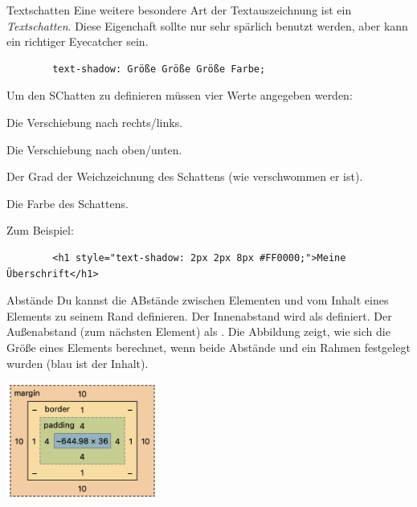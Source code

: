 \documentclass[lerntheke,12pt,a5paper,landscape]{arbeitsblatt}
\begin{document}
\begin{loesungskarte}{Textschatten}
	Eine weitere besondere Art der Textauszeichnung ist ein \emph{Textschatten}. Diese Eigenchaft sollte nur sehr spärlich benutzt werden, aber kann ein richtiger Eyecatcher sein.

	\begin{verbatim}
		text-shadow: Größe Größe Größe Farbe;
	\end{verbatim}

	Um den SChatten zu definieren müssen vier Werte angegeben werden:
	\begin{smallenum}
		\item Die Verschiebung nach rechts/links.
		\item Die Verschiebung nach oben/unten.
		\item Der Grad der Weichzeichnung des Schattens (wie verschwommen er ist).
		\item Die Farbe des Schattens.
	\end{smallenum}

	Zum Beispiel:
	\begin{verbatim}
		<h1 style="text-shadow: 2px 2px 8px #FF0000;">Meine Überschrift</h1>
	\end{verbatim}
\end{loesungskarte}

\begin{karte2}{Abstände}
	Du kannst die ABstände zwischen Elementen und vom Inhalt eines Elements zu seinem Rand definieren. Der Innenabstand wird als  definiert. Der Außenabstand (zum nächsten Element) als . Die Abbildung zeigt, wie sich die Größe eines Elements berechnet, wenn beide Abstände und ein Rahmen festgelegt wurden (blau ist der Inhalt).

	\begin{center}
		\includegraphics[width=5cm]{9Diff-LT.2-Abb_Abstand.png}
	\end{center}
\end{karte2}
\end{document}
